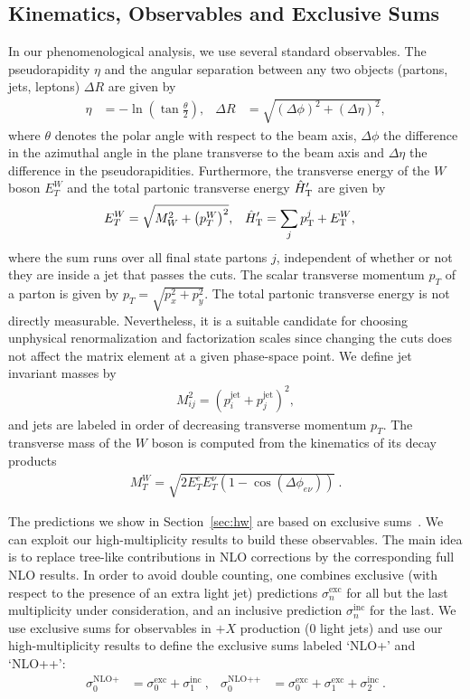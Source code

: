 \subsection{Kinematics, Observables and Exclusive Sums}
\label{sec:kin}
In our phenomenological analysis, we use several standard observables. The pseudorapidity $\eta$ and the
angular separation between any two objects (partons, jets, leptons) $\Delta R$ are given by
\begin{align}
  \eta &= -\ln\left(\tan\frac{\theta}{2}\right),&  \Delta R &= \sqrt{(\Delta \phi)^2+(\Delta \eta)^2},
\end{align}
where $\theta$ denotes the polar angle with respect to the beam axis, $\Delta\phi$ the difference in the azimuthal angle in the
plane transverse to the beam axis and
$\Delta\eta$ the difference in the pseudorapidities. Furthermore, the transverse
energy of the $W$ boson $E_T^W$ and the total partonic transverse energy ${\hat H}_{\mathrm T}'$ are given by
\begin{align}\label{eq:htpart}
  E_T^W&=\sqrt{M_W^2+\left(p_T^W \right)^2},& {\hat H}_{\mathrm T}'&=\sum_j p_{\textrm T}^j+E_{\textrm T}^W,
\end{align}
where the sum runs over all final state partons $j$, independent of
whether or not they are inside a jet that passes the cuts. The scalar
transverse momentum $p_T$ of a parton is given by
$p_T=\sqrt{p_x^2+p_y^2}$. The total partonic transverse energy is not directly measurable. Nevertheless, it is
a suitable candidate for choosing unphysical renormalization and
factorization scales since changing the cuts does not affect the
matrix element at a given phase-space point. We define jet invariant masses by
\begin{align}
  M_{ij}^2 = \left(p_i^{\text{jet}}+p_j^{\text{jet}}\right)^2,
\end{align}
and jets are labeled in order of decreasing transverse momentum
$p_T$. The transverse mass of the $W$ boson is computed from the
kinematics of its decay products
\begin{align}
  M_T^W=\sqrt{2E_T^eE_T^\nu(1-\cos(\Delta\phi_{e\nu}))}\ .
\end{align}

The predictions we show in Section~\ref{sec:hw} are based on exclusive
sums~\cite{ESums}. We can exploit our high-multiplicity results to build these observables. The main idea is to replace tree-like contributions in NLO
corrections by the corresponding full NLO results. In order to avoid double counting, one combines exclusive (with respect to the presence of an extra light jet)
predictions $\sigma^{\text{exc}}_n$ for all but the last multiplicity under consideration,
and an inclusive prediction $\sigma^{\text{inc}}_n$  for the last.
 We use
exclusive sums for observables in \Wbb$+X$ production (0 light jets) and use our high-multiplicity
results to define the exclusive sums labeled `NLO+' and `NLO++':
\begin{align}\label{eq:excsums}
  \sigma^{\text{NLO+}}_0 &= \sigma^{\text{exc}}_0 + \sigma^{\text{inc}}_1\ , &
\sigma^{\text{NLO++}}_0 &= \sigma^{\text{exc}}_0 +\sigma^{\text{exc}}_1+
\sigma^{\text{inc}}_2\ .
\end{align}

